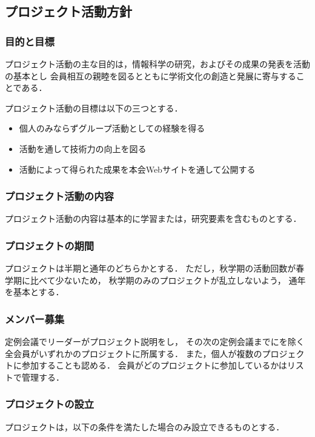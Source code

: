 \subsection*{プロジェクト活動方針}


\subsubsection*{目的と目標}
プロジェクト活動の主な目的は，情報科学の研究，およびその成果の発表を活動の基本とし
会員相互の親睦を図るとともに学術文化の創造と発展に寄与することである．

プロジェクト活動の目標は以下の三つとする．

\begin{itemize}
\item 個人のみならずグループ活動としての経験を得る
\item 活動を通して技術力の向上を図る
\item 活動によって得られた成果を本会Webサイトを通して公開する
\end{itemize}

\subsubsection*{プロジェクト活動の内容}
プロジェクト活動の内容は基本的に学習または，研究要素を含むものとする．

\subsubsection*{プロジェクトの期間}
プロジェクトは半期と通年のどちらかとする．
ただし，秋学期の活動回数が春学期に比べて少ないため，
秋学期のみのプロジェクトが乱立しないよう，
通年を基本とする．

\subsubsection*{メンバー募集}
定例会議でリーダーがプロジェクト説明をし，
その次の定例会議までに\fourthGrade{}を除く全会員がいずれかのプロジェクトに所属する．
また，個人が複数のプロジェクトに参加することも認める．
会員がどのプロジェクトに参加しているかはリストで管理する．

\subsubsection*{プロジェクトの設立}
プロジェクトは，以下の条件を満たした場合のみ設立できるものとする．

